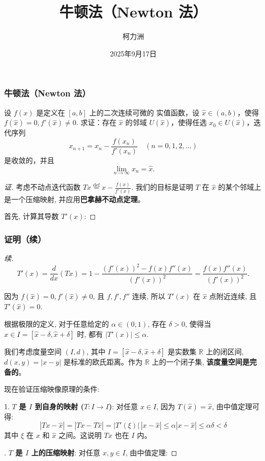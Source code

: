 \documentclass[hyperref={pdfpagelabels=false}, xelatex, aspectratio=169, 10pt]{beamer}
\title{牛顿法（Newton 法）} %
\author{柯力洲} %
\date{2025年9月17日} %
\begin{document}
\frame{\titlepage}

\begin{frame}[fragile]
  \frametitle{牛顿法（Newton 法）}
  \begin{example}[例 8 (Newton 法)]
    设 $f(x)$ 是定义在 $[a, b]$ 上的二次连续可微的
    实值函数，设 $\hat x \in (a, b)$，使得 $f(\hat x) = 0, f'(\hat x) \neq 0$. 求证：存在 $\hat x$ 的邻域
    $U(\hat x)$，使得任选 $x_0 \in U(\hat x)$，迭代序列
    \[
      x_{n+1} = x_n - \frac{f(x_n)}{f'(x_n)} \quad (n=0, 1, 2, \dots)
    \]
    是收敛的，并且
    \[
      \lim_{n \to \infty} x_n = \hat x.
    \]
  \end{example}
  
  \begin{proof}[证]
    考虑不动点迭代函数 $Tx \stackrel{\mathrm{def}}{=} x - \frac{f(x)}{f'(x)}$.
    我们的目标是证明 $T$ 在 $\hat x$ 的某个邻域上是一个压缩映射, 并应用\textbf{巴拿赫不动点定理}。

    \medskip %

    首先, 计算其导数 $T'(x)$:
  \end{proof}
\end{frame}

\begin{frame}[fragile]
  \frametitle{证明（续）}
    \begin{proof}[续]


    \[
      T'(x) = \frac{d}{dx}(Tx) = 1 - \frac{(f'(x))^2 - f(x)f''(x)}{(f'(x))^2} = \frac{f(x)f''(x)}{(f'(x))^2}.
    \]

    因为 $f(\hat x) = 0, f'(\hat x) \neq 0$, 且 $f, f', f''$ 连续, 所以 $T'(x)$ 在 $\hat x$ 点附近连续, 且 $T'(\hat x) = 0$.

    \medskip

    根据极限的定义, 对于任意给定的 $\alpha \in (0, 1)$, 存在 $\delta > 0$, 使得当 $x \in I = [\hat x - \delta, \hat x + \delta]$ 时, 都有 $|T'(x)| \leq \alpha$.

    \medskip

        我们考虑度量空间 $(I, d)$, 其中 $I = [\hat x - \delta, \hat x + \delta]$ 是实数集 $\mathbb{R}$ 上的闭区间, $d(x, y) = |x - y|$ 是标准的欧氏距离。作为 $\mathbb{R}$ 上的一个闭子集, \textbf{该度量空间是完备的}。

    \medskip

    现在验证压缩映像原理的条件:

        1. \textbf{$T$ 是 $I$ 到自身的映射 ($T: I \to I$)}:
        对任意 $x \in I$, 因为 $T(\hat x)=\hat x$, 由中值定理可得:
        \[ |Tx - \hat x| = |Tx - T\hat x| = |T'(\xi)|\,|x - \hat x| \le \alpha |x - \hat x| \le \alpha\delta < \delta \]
        其中 $\xi$ 在 $x$ 和 $\hat x$ 之间。这说明 $Tx$ 也在 $I$ 内。

        . \textbf{$T$ 是 $I$ 上的压缩映射}:
        对任意 $x, y \in I$, 由中值定理:

  \end{proof}
\end{frame}
\end{document}
